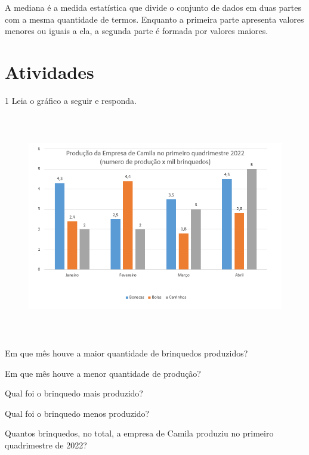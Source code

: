 {{{{A mediana é a medida estatística que divide o conjunto de dados em duas
partes com a mesma quantidade de termos. Enquanto a primeira parte
apresenta valores menores ou iguais a ela, a segunda parte é formada por
valores maiores.}

\section*{Atividades}

\num{1} Leia o gráfico a seguir e responda.

\begin{figure}[H]
\centering\includegraphics[width=5.90625in,height=3.86458in]{./imgSAEB_8_MAT/media/image39.png}
\end{figure}

\begin{escolha}[itemsep=0pt]
\item Em que mês houve a maior quantidade de brinquedos produzidos?

\item Em que mês houve a menor quantidade de produção?

\item Qual foi o brinquedo mais produzido?

\item Qual foi o brinquedo menos produzido?

\item Quantos brinquedos, no total, a empresa de Camila produziu no primeiro quadrimestre de 2022?


\end{escolha}}}}

